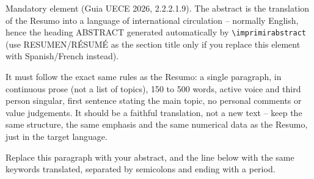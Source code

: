 Mandatory element (Guia UECE 2026, 2.2.2.1.9). The abstract is the translation of the Resumo into a language of international circulation -- normally English, hence the heading ABSTRACT generated automatically by \texttt{\textbackslash imprimirabstract} (use RESUMEN/RÉSUMÉ as the section title only if you replace this element with Spanish/French instead).

It must follow the exact same rules as the Resumo: a single paragraph, in continuous prose (not a list of topics), 150 to 500 words, active voice and third person singular, first sentence stating the main topic, no personal comments or value judgements. It should be a faithful translation, not a new text -- keep the same structure, the same emphasis and the same numerical data as the Resumo, just in the target language.

Replace this paragraph with your abstract, and the line below with the same keywords translated, separated by semicolons and ending with a period.


